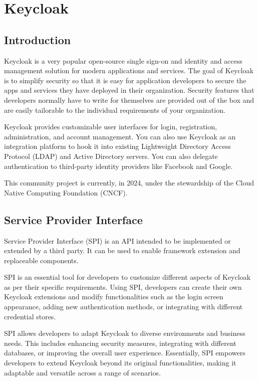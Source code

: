 \chapter{Keycloak}

\section{Introduction}
Keycloak is a very popular open-source single sign-on and identity and access management solution for modern applications and services.
The goal of Keycloak is to simplify security so that it is easy for application developers to secure the apps and services they have deployed in their organization.
Security features that developers normally have to write for themselves are provided out of the box and are easily tailorable to the individual requirements of your organization.

Keycloak provides customizable user interfaces for login, registration, administration, and account management.
You can also use Keycloak as an integration platform to hook it into existing Lightweight Directory Access Protocol (LDAP) and Active Directory servers.
You can also delegate authentication to third-party identity providers like Facebook and Google.

This community project is currently, in 2024, under the stewardship of the Cloud Native Computing Foundation (CNCF).\cite{keycloak-web}

\section{Service Provider Interface}\label{keycloak-spi}
Service Provider Interface (SPI) is an API intended to be implemented or extended by a third party.
It can be used to enable framework extension and replaceable components.\cite{keycloak-spi}

SPI is an essential tool for developers to customize different aspects of Keycloak as per their specific requirements.
Using SPI, developers can create their own Keycloak extensions and modify functionalities such as the login screen appearance, adding new authentication methods, or integrating with different credential stores.

SPI allows developers to adapt Keycloak to diverse environments and business needs.
This includes enhancing security measures, integrating with different databases, or improving the overall user experience. Essentially, SPI empowers developers to extend Keycloak beyond its original functionalities, making it adaptable and versatile across a range of scenarios.

